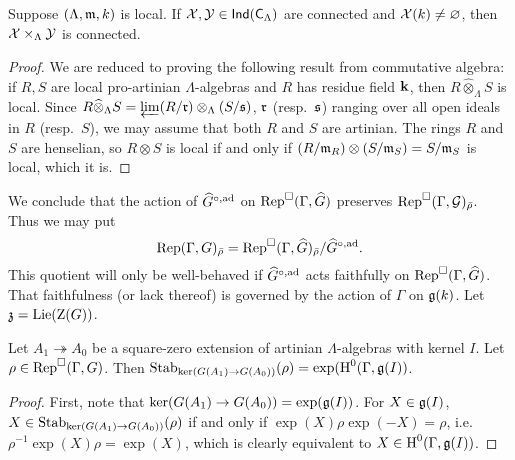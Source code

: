 \begin{theorem}
Suppose $(\Lambda,\mathfrak{m},k)$ is local. If $\mathcal{X},\mathcal{Y}\in \operatorname{\mathsf{Ind}}(\mathsf{C}_\Lambda)$ are 
connected and $\mathcal{X}(k)\ne\varnothing$, then $\mathcal{X}\times_\Lambda \mathcal{Y}$ is 
connected. 
\end{theorem}
\begin{proof}
We are reduced to proving the following result from commutative algebra: if 
$R,S$ are local pro-artinian $\Lambda$-algebras and $R$ has residue field 
$\mathbf{k}$, then $R\widehat\otimes_\Lambda S$ is local. Since 
$R\widehat\otimes_\Lambda S = \varprojlim (R/\mathfrak{r})\otimes_\Lambda (S/\mathfrak{s})$, 
$\mathfrak{r}$ (resp.~$\mathfrak{s}$) ranging over all open ideals in $R$ (resp.~$S$), we may 
assume that both $R$ and $S$ are artinian. The rings $R$ and $S$ are 
henselian, so $R\otimes S$ is local if and only if 
$(R/\mathfrak{m}_R)\otimes (S/\mathfrak{m}_S) = S/\mathfrak{m}_S$ is local, which it is. 
\end{proof}

We conclude that the action of $\widehat G^{\circ,\mathrm{ad}}$ on 
$\operatorname{Rep}^\square(\Gamma,\widehat G)$ 
preserves $\operatorname{Rep}^\square(\Gamma,\mathcal{G})_{\bar\rho}$. Thus we may put 
\[
	\operatorname{Rep}(\Gamma,G)_{\bar\rho} = \operatorname{Rep}^\square(\Gamma,\widehat G)_{\bar\rho} / \widehat G^{\circ,\mathrm{ad}} .
\]
This quotient will only be well-behaved if $\widehat G^{\circ,\mathrm{ad}}$ 
acts faithfully on $\operatorname{Rep}^\square(\Gamma,\widehat G)$. That faithfulness (or 
lack thereof) is governed by the action of $\Gamma$ on $\mathfrak{g}(k)$. Let 
$\mathfrak{z} = \operatorname{Lie}(\operatorname{Z}(G))$. 

\begin{lemma}\label{lem:stab=H0}
Let $A_1 \twoheadrightarrow A_0$ be a square-zero extension of artinian 
$\Lambda$-algebras with kernel $I$. Let $\rho\in \operatorname{Rep}^\square(\Gamma,G)$. 
Then $\operatorname{Stab}_{\ker(G(A_1) \to G(A_0))}(\rho) = \exp(\operatorname{H}^0(\Gamma,\mathfrak{g}(I))$. 
\end{lemma}
\begin{proof}
First, note that $\ker(G(A_1) \to G(A_0)) = \exp(\mathfrak{g}(I))$. For $X\in \mathfrak{g}(I)$, 
$X\in \operatorname{Stab}_{\ker(G(A_1) \to G(A_0))}(\rho)$ if and only if 
$\exp(X) \rho \exp(-X) = \rho$, i.e.~$\rho^{-1} \exp(X) \rho = \exp(X)$, 
which is clearly equivalent to $X\in \operatorname{H}^0(\Gamma,\mathfrak{g}(I))$. 
\end{proof}

